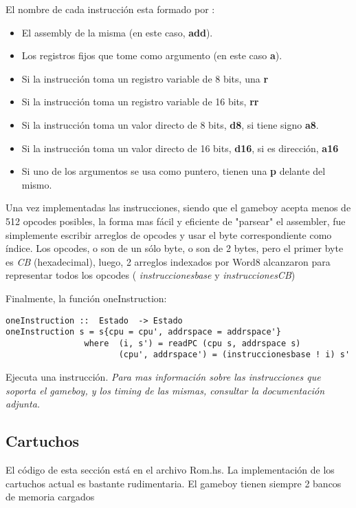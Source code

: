 \documentclass[a4paper,10pt]{report}
\begin{document}
El nombre de cada instrucción esta formado por :
\begin{itemize}
  \item El assembly de la misma (en este caso, \textbf{add}).
  \item Los registros fijos que tome como argumento (en este caso \textbf{a}).
  \item Si la instrucción toma un registro variable de 8 bits, una \textbf{r}
  \item Si la instrucción toma un registro variable de 16 bits, \textbf{rr}
  \item Si la instrucción toma un valor directo de 8 bits, \textbf{d8}, si tiene signo \textbf{a8}.
  \item Si la instrucción toma un valor directo de 16 bits, \textbf{d16}, si es dirección, \textbf{a16}
  \item Si uno de los argumentos se usa como puntero, tienen una \textbf{p} delante del mismo.
\end{itemize}

Una vez implementadas las instrucciones, siendo que el gameboy acepta menos de 512 opcodes posibles, la forma mas fácil y eficiente de "parsear" el assembler, fue simplemente escribir arreglos de opcodes y usar el byte correspondiente como índice. Los opcodes, o son de un sólo byte, o son de 2 bytes, pero el primer byte es \textit{CB} (hexadecimal), luego, 2 arreglos indexados por Word8 alcanzaron para representar todos los opcodes ( \textit{instruccionesbase} y \textit{instruccionesCB})

Finalmente, la función oneInstruction:\begin{verbatim}
oneInstruction ::  Estado  -> Estado
oneInstruction s = s{cpu = cpu', addrspace = addrspace'}
                where  (i, s') = readPC (cpu s, addrspace s)
                       (cpu', addrspace') = (instruccionesbase ! i) s'
\end{verbatim}
Ejecuta una instrucción.
\clearpage
\textit{Para mas información sobre las instrucciones que soporta el gameboy, y los timing de las mismas, consultar la documentación adjunta.}
\subsection*{Cartuchos}
El código de esta sección está en el archivo Rom.hs. La implementación de los cartuchos actual es bastante rudimentaria. El gameboy tienen siempre 2 bancos de memoria cargados
\end{document}
